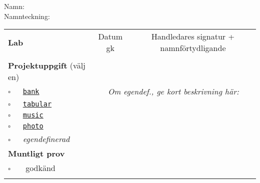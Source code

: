\vspace{2.5em}\noindent Namn: \dotfill\\

\vspace{1em}\noindent Namnteckning: \dotfill\\

\newcommand{\LabRow}[1]{\\[-1.1em] \hyperref[section:lab:#1]{\texttt{#1}} & \dotfill &  \dotfill  \\ \addlinespace }

\begin{table}[h]
\vspace{1em}
\begin{tabular}{lcc}
\toprule \addlinespace
{\sffamily\bfseries\small Lab} & {\sffamily\small Datum gk} &	
{\sffamily\small Handledares signatur + namnförtydligande}\\ \addlinespace 
\\[-0.5em]

\addlinespace 
\addlinespace\addlinespace
{\sffamily\small {\bfseries Projektuppgift} (välj en)	} & \dotfill &  \dotfill  \\
\addlinespace\addlinespace %
{\Large$\square$}\texttt{~~~\hyperref[section:proj:bank]{bank}} &
\multicolumn{2}{c}{\textit{Om egendef., ge kort beskrivning här:}}  \\ \addlinespace
{\Large$\square$}\texttt{~~~\hyperref[section:proj:tabular]{tabular}} \\ \addlinespace
{\Large$\square$}\texttt{~~~\hyperref[section:proj:music]{music}} \\ \addlinespace
{\Large$\square$}\texttt{~~~\hyperref[section:proj:photo]{photo}}  \\ \addlinespace
{\Large$\square$}\texttt{~~~}\textit{egendefinerad}  \\
\addlinespace\addlinespace
\addlinespace
{\sffamily\small {\bfseries Muntligt prov}} &  & \\
\addlinespace\addlinespace{}
{\Large$\square$}\texttt{~~~} godkänd & \dotfill &  \dotfill \\
\addlinespace\addlinespace\bottomrule
\end{tabular}
\end{table}
